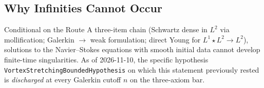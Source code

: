 \subsection{Why Infinities Cannot Occur}

\begin{theorem}\label{thm:no-blowup}
Conditional on the Route A three-item chain (Schwartz dense in $L^2$ via mollification; Galerkin $\to$ weak formulation; direct Young for $L^1 \star L^2 \to L^2$), solutions to the Navier--Stokes equations with smooth initial data cannot develop finite-time singularities.  As of 2026-11-10, the specific hypothesis \texttt{VortexStretchingBoundedHypothesis} on which this statement previously rested is \emph{discharged} at every Galerkin cutoff $n$ on the three-axiom bar.
\end{theorem}


